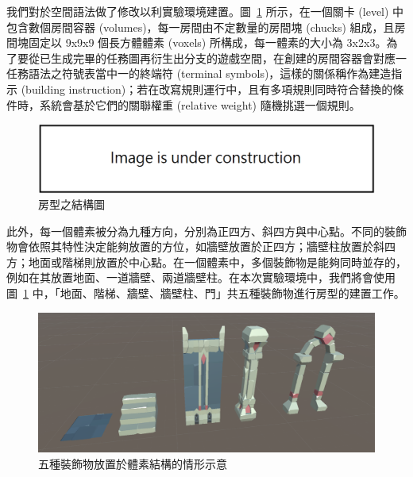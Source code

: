 我們對於空間語法做了修改以利實驗環境建置。圖~\ref{fig:spacepieces-structure} 所示，在一個關卡 (level) 中包含數個房間容器 (volumes)，每一房間由不定數量的房間塊 (chucks) 組成，且房間塊固定以 9x9x9 個長方體體素 (voxels) 所構成，每一體素的大小為 3x2x3。為了要從已生成完畢的任務圖再衍生出分支的遊戲空間，在創建的房間容器會對應一任務語法之符號表當中一的終端符 (terminal symbols)，這樣的關係稱作為建造指示 (building instruction)；若在改寫規則運行中，且有多項規則同時符合替換的條件時，系統會基於它們的關聯權重 (relative weight) 隨機挑選一個規則。

\begin{figure}[ht]
  \begin{center}
    \includegraphics[width=1.0\textwidth]{figures/under_construction.png}
    \caption{房型之結構圖} 
    \label{fig:spacepieces-structure}
  \end{center}
\end{figure}

此外，每一個體素被分為九種方向，分別為正四方、斜四方與中心點。不同的裝飾物會依照其特性決定能夠放置的方位，如牆壁放置於正四方；牆壁柱放置於斜四方；地面或階梯則放置於中心點。在一個體素中，多個裝飾物是能夠同時並存的，例如在其放置地面、一道牆壁、兩道牆壁柱。在本次實驗環境中，我們將會使用圖~\ref{fig:spacepieces-structure} 中，「地面、階梯、牆壁、牆壁柱、門」共五種裝飾物進行房型的建置工作。

\begin{figure}[ht]
  \begin{center}
    \includegraphics[width=1.0\textwidth]{figures/decorations-with-directions.png}
    \caption{五種裝飾物放置於體素結構的情形示意}
    \label{fig:decorations-with-directions}
  \end{center}
\end{figure}

